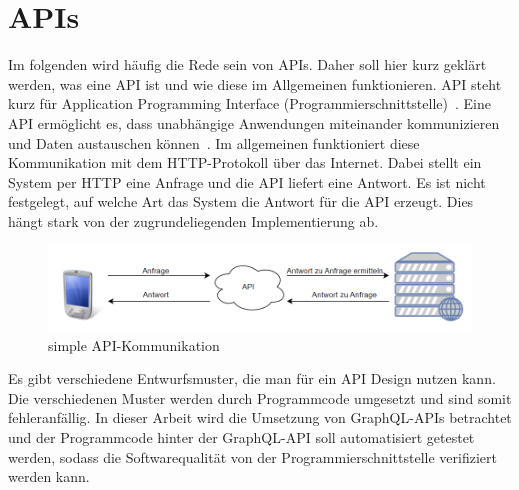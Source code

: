 \section{APIs}
\label{api}

Im folgenden wird häufig die Rede sein von APIs.
Daher soll hier kurz geklärt werden, was eine API ist und wie diese im Allgemeinen funktionieren.
API steht kurz für Application Programming Interface (Programmierschnittstelle)~\cite[vgl.]{api}.
Eine API ermöglicht es, dass unabhängige Anwendungen miteinander kommunizieren und Daten austauschen können~\cite{api}.
Im allgemeinen funktioniert diese Kommunikation mit dem HTTP-Protokoll über das Internet.
Dabei stellt ein System per HTTP eine Anfrage und die API liefert eine Antwort.
Es ist nicht festgelegt, auf welche Art das System die Antwort für die API erzeugt.
Dies hängt stark von der zugrundeliegenden Implementierung ab.

\begin{figure}[h!]
    \centering
    \includegraphics[width=\textwidth,height=\textheight,keepaspectratio]{img/webapi}
    \caption{simple API-Kommunikation}
    \label{basicapi}
\end{figure}

Es gibt verschiedene Entwurfsmuster, die man für ein API Design nutzen kann.
Die verschiedenen Muster werden durch Programmcode umgesetzt und sind somit fehleranfällig.
In dieser Arbeit wird die Umsetzung von GraphQL-APIs betrachtet und der Programmcode hinter der GraphQL-API
soll automatisiert getestet werden, sodass die Softwarequalität von der Programmierschnittstelle verifiziert werden kann.